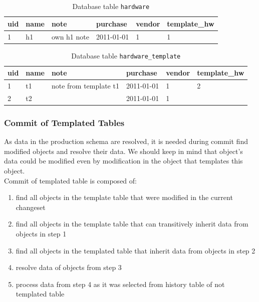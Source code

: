 \documentclass[deska]{subfiles}
\begin{document}
\begin{longtable}{ l | l | l | l | l | l }
    \caption{Database table {\tt hardware}}
    \label{tab:templ-hw} \\
    uid & name & note & purchase & vendor & template\_hw\\
    \hline
    \endhead
    1 & h1 & own h1 note & 2011-01-01 & 1 & 1\\
    \hline
\end{longtable}

\begin{longtable}{ l | l | l | l | l | l }
    \caption{Database table {\tt hardware\_template}}
    \label{tab:templ-hwtempl} \\
    uid & name & note & purchase & vendor & template\_hw\\
    \hline
    \endhead
    1 & t1 & note from template t1 & 2011-01-01 & 1 & 2\\
    2 & t2 &  & 2011-01-01 & 1 & \\
    \hline
\end{longtable}

\subsubsection{Commit of Templated Tables}
As data in the production schema are resolved, it is needed during commit find modified objects and resolve their data. We should keep in mind that object's data could be modified even by modification in the object that templates this object.\\
Commit of templated table is composed of:
\begin{enumerate}
    \item find all objects in the template table that were modified in the current changeset
    \item find all objects in the template table that can transitively inherit data from objects in step 1
    \item find all objects in the templated table that inherit data from objects in step 2
    \item resolve data of objects from step 3
    \item process data from step 4 as it was selected from history table of not templated table
\end{enumerate}
\end{document}
